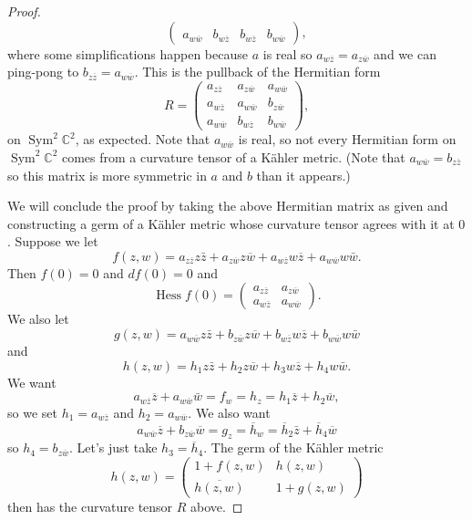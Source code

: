 \documentclass[10pt,a4paper]{amsart}
\theoremstyle{definition}
\def\ov#1{\overline{#1}}
\newcommand{\kk}[1]{\mathbb{#1}}
\DeclareMathOperator{\Sym}{Sym}
\begin{document}
\begin{proof}
$$\begin{pmatrix}
\\
a_{w \ov w} & b_{w \ov z} & b_{w \ov z} & b_{w \ov w}
\end{pmatrix},
$$
where some simplifications happen because $a$ is real so $a_{w \ov z} =
a_{z \ov w}$ and we can ping-pong to $b_{z \ov z} = a_{w \ov w}$.
This is the pullback of the Hermitian form
$$
R = \begin{pmatrix}
a_{z \ov z} & a_{z \ov w} & a_{w \ov w}
\\
a_{w \ov z} & a_{w \ov w} & b_{z \ov w}
\\
a_{w \ov w} & b_{w \ov z} & b_{w \ov w}
\end{pmatrix},
$$
on $\Sym^2 \kk C^2$, as expected.
Note that $a_{w \ov w}$ is real, so not every Hermitian form on
$\Sym^2 \kk C^2$ comes from a curvature tensor of a K\"ahler metric.
(Note that $a_{w \ov w} = b_{z \ov z}$ so this matrix is more symmetric in $a$
and $b$ than it appears.)


We will conclude the proof by taking the above Hermitian matrix as given and
constructing a germ of a K\"ahler metric whose curvature tensor agrees with it
at $0$.
Suppose we let
$$
f(z,w)
= a_{z \ov z} z \bar z
+ a_{z \ov w} z \ov w
+ a_{w \ov z} w \ov z
+ a_{w \ov w} w \bar w.
$$
Then $f(0) = 0$ and $df(0) = 0$ and
$$
\operatorname{Hess} f(0)
= \begin{pmatrix}
a_{z \ov z} & a_{z \ov w}
\\
a_{w \ov z} & a_{w \ov w}
\end{pmatrix}.
$$
We also let
$$
g(z,w)
= a_{w \ov w} z \bar z
+ b_{z \ov w} z \ov w
+ b_{w \ov z} w \ov z
+ b_{w \ov w} w \bar w
$$
and
$$
h(z,w)
= h_1 z \bar z
+ h_2 z \ov w
+ h_3 w \ov z
+ h_4 w \bar w.
$$
We want
$$
a_{w \ov z} \ov z + a_{w \ov w} \bar w
= f_w = h_z
= h_1 \ov z + h_2 \ov w,
$$
so we set $h_1 = a_{w \ov z}$ and $h_2 = a_{w \ov w}$.
We also want
$$
a_{w \ov w} \ov z + b_{z \ov w} \ov w
= g_z = \ov h_w
= \ov h_2 \bar z + \ov h_4 \ov w
$$
so $h_4 = b_{z \ov w}$.
Let's just take $h_3 = \ov h_4$.
The germ of the K\"ahler metric
$$
h(z,w)
= \begin{pmatrix}
1 + f(z,w) & h(z,w)
\\
\ov{h(z,w)} & 1 + g(z,w)
\end{pmatrix}
$$
then has the curvature tensor $R$ above.
\end{proof}
\end{document}
